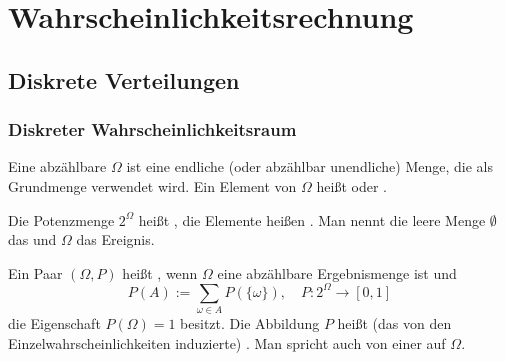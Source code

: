 
\chapter{Wahrscheinlichkeitsrechnung}

\section{Diskrete Verteilungen}

\subsection{Diskreter Wahrscheinlichkeitsraum}

\begin{definition}\mbox{}\newline%
%
Eine abzählbare  $\Omega$ ist eine endliche
(oder abzählbar unendliche) Menge, die als Grundmenge verwendet wird.
Ein Element von $\Omega$ heißt  oder
.

Die Potenzmenge $2^\Omega$ heißt , die
Elemente heißen .
Man nennt die leere Menge $\emptyset$ das  und $\Omega$
das  Ereignis.
\end{definition}

\begin{definition}\mbox{}\newline%
%
Ein Paar $(\Omega,P)$ heißt , wenn
$\Omega$ eine abzählbare Ergebnismenge ist und%
\begin{equation}
P(A):=\sum_{\omega\in A} P(\{\omega\}),\quad P\colon 2^\Omega\to [0,1]
\end{equation}
die Eigenschaft $P(\Omega)=1$ besitzt. Die Abbildung $P$ heißt (das von
den Einzelwahrscheinlichkeiten induzierte) .
Man spricht auch von einer  auf $\Omega$.
\end{definition}


